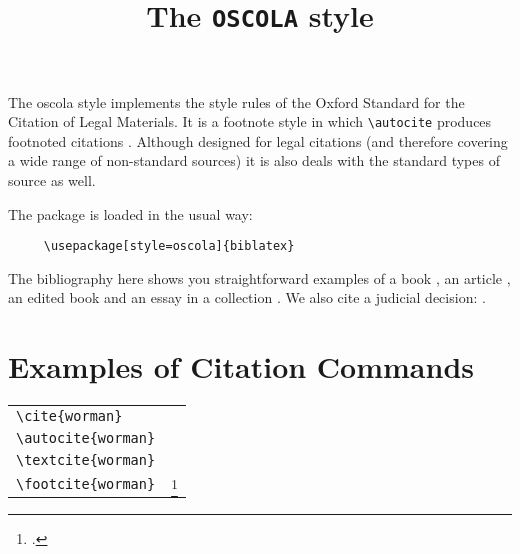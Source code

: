 \documentclass{article}
\begin{document}
 

\title{The \texttt{OSCOLA} style}
\author{}\date{} 
\maketitle 
\thispagestyle{empty}

\noindent
The \textsf{oscola} style implements the style rules of the Oxford Standard for the Citation of Legal Materials. It is a footnote style in which  \verb~\autocite~ produces footnoted citations \autocite{worman, reese}. Although designed for legal citations (and therefore covering a wide range of non-standard sources) it is also deals with the standard types of source as well.

\quad The package is loaded in the usual way:
\begin{verbatim}
     \usepackage[style=oscola]{biblatex}
\end{verbatim}

\quad The bibliography here shows you straightforward examples of a book \autocite{worman}, an article \autocite{reese}, an edited book \autocite{aristotle:anima} and an essay in a collection \autocite{gaonkar:in}. We also cite a judicial decision: \cite{donoghue}.

\section*{Examples of Citation Commands}

\begin{tabularx}{\textwidth}{lX}
\verb|\cite{worman}| & \cite{worman} \\
\verb|\autocite{worman}| & \strut\autocite{worman} \\
\verb|\textcite{worman}| & \textcite{worman} \\
\verb|\footcite{worman}| & \strut\footcite{worman}
\end{tabularx}


\printbibliography[title={Sample Bibliography}]
\end{document}
